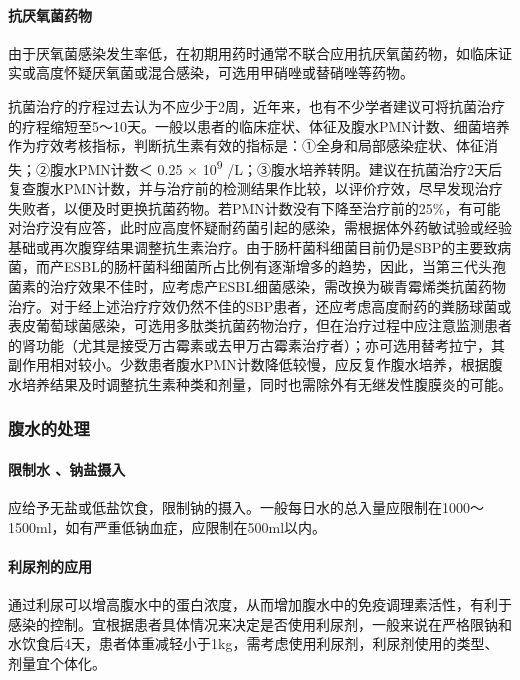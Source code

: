 \paragraph{抗厌氧菌药物}

由于厌氧菌感染发生率低，在初期用药时通常不联合应用抗厌氧菌药物，如临床证实或高度怀疑厌氧菌或混合感染，可选用甲硝唑或替硝唑等药物。

抗菌治疗的疗程过去认为不应少于2周，近年来，也有不少学者建议可将抗菌治疗的疗程缩短至5～10天。一般以患者的临床症状、体征及腹水PMN计数、细菌培养作为疗效考核指标，判断抗生素有效的指标是：①全身和局部感染症状、体征消失；②腹水PMN计数＜
0.25 × 10\textsuperscript{9}
/L；③腹水培养转阴。建议在抗菌治疗2天后复查腹水PMN计数，并与治疗前的检测结果作比较，以评价疗效，尽早发现治疗失败者，以便及时更换抗菌药物。若PMN计数没有下降至治疗前的25\%，有可能对治疗没有应答，此时应高度怀疑耐药菌引起的感染，需根据体外药敏试验或经验基础或再次腹穿结果调整抗生素治疗。由于肠杆菌科细菌目前仍是SBP的主要致病菌，而产ESBL的肠杆菌科细菌所占比例有逐渐增多的趋势，因此，当第三代头孢菌素的治疗效果不佳时，应考虑产ESBL细菌感染，需改换为碳青霉烯类抗菌药物治疗。对于经上述治疗疗效仍然不佳的SBP患者，还应考虑高度耐药的粪肠球菌或表皮葡萄球菌感染，可选用多肽类抗菌药物治疗，但在治疗过程中应注意监测患者的肾功能（尤其是接受万古霉素或去甲万古霉素治疗者）；亦可选用替考拉宁，其副作用相对较小。少数患者腹水PMN计数降低较慢，应反复作腹水培养，根据腹水培养结果及时调整抗生素种类和剂量，同时也需除外有无继发性腹膜炎的可能。

\subsubsection{腹水的处理}

\paragraph{限制水 、钠盐摄入}

应给予无盐或低盐饮食，限制钠的摄入。一般每日水的总入量应限制在1000～1500ml，如有严重低钠血症，应限制在500ml以内。

\paragraph{利尿剂的应用}

通过利尿可以增高腹水中的蛋白浓度，从而增加腹水中的免疫调理素活性，有利于感染的控制。宜根据患者具体情况来决定是否使用利尿剂，一般来说在严格限钠和水饮食后4天，患者体重减轻小于1kg，需考虑使用利尿剂，利尿剂使用的类型、剂量宜个体化。


